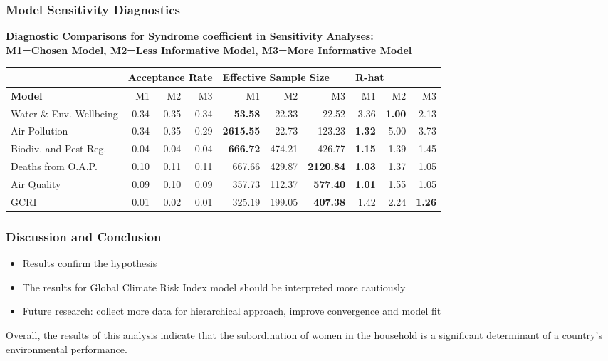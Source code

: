 \documentclass{beamer}
\begin{document}
\begin{frame}
\frametitle{Model Sensitivity Diagnostics}
\begin{table}[htb]
       \tiny
    \centering
\textbf{\footnotesize{Diagnostic Comparisons for Syndrome coefficient in Sensitivity Analyses:}\\ \tiny{ M1=Chosen Model, M2=Less Informative Model, M3=More Informative Model}}\par\medskip
    \begin{tabular}{l||r|r|r||r|r|r||r|r|r}
      & \multicolumn{3}{l}{\textbf{Acceptance Rate}} & \multicolumn{3}{l}{\textbf{Effective Sample Size}} & \multicolumn{3}{l}{\textbf{R-hat}} \\
     \hline
     \textbf{Model} & M1 & M2 & M3 & M1 & M2 & M3 & M1 & M2 & M3 \\
    \hline
    Water \& Env. Wellbeing & 0.34 & 0.35 & 0.34
    & \bf{53.58}  & 22.33 & 22.52
    & 3.36  & \bf{1.00} & 2.13 \\
    Air Pollution  & 0.34  & 0.35 & 0.29
    & \bf{2615.55}  & 22.73 & 123.23
    & \bf{1.32}  & 5.00 & 3.73 \\
    Biodiv. and Pest Reg.  & 0.04 & 0.04 &  0.04
    & \bf{666.72}  & 474.21 & 426.77
    & \bf{1.15}  & 1.39 & 1.45 \\
    Deaths from O.A.P.  & 0.10  & 0.11 & 0.11
    & 667.66  & 429.87 & \bf{2120.84}
    & \bf{1.03}  & 1.37 & 1.05 \\
    Air Quality & 0.09  & 0.10 & 0.09
    & 357.73  & 112.37 & \bf{577.40}
    & \bf{1.01}  & 1.55 & 1.05 \\
    GCRI  & 0.01  & 0.02 & 0.01
    & 325.19  & 199.05 & \bf{407.38}
    & 1.42  & 2.24 & \bf{1.26} \\
    \end{tabular}
    \label{diagSynSens}
\end{table}
\end{frame}

\begin{frame}
\frametitle{Discussion and Conclusion}
\begin{itemize}
\item Results confirm the hypothesis 
\item The results for Global Climate Risk Index model should be interpreted more cautiously
\item Future research: collect more data for hierarchical approach, improve convergence and model fit
\end{itemize}
Overall, the results of this analysis indicate that the subordination of women in the household is a significant determinant of a country's environmental performance. 
\end{frame}
\end{document}
